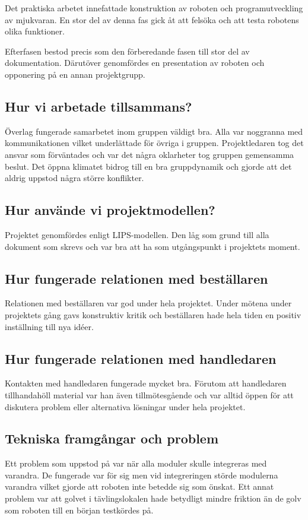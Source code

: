 \documentclass[11pt]{article}
\begin{document}
Det praktiska arbetet innefattade konstruktion av roboten och programutveckling av mjukvaran. En stor del av denna fas gick åt att felsöka och att testa robotens olika funktioner. 

Efterfasen bestod precis som den förberedande fasen till stor del av dokumentation. Därutöver genomfördes en presentation av roboten och opponering på en annan projektgrupp.

\subsection{Hur vi arbetade tillsammans?}
Överlag fungerade samarbetet inom gruppen väldigt bra. Alla var noggranna med kommunikationen vilket underlättade för övriga i gruppen. Projektledaren tog det ansvar som förväntades och var det några oklarheter tog gruppen gemensamma beslut. Det öppna klimatet bidrog till en bra gruppdynamik och gjorde att det aldrig uppstod några större konflikter.

\subsection{Hur använde vi projektmodellen?} 
Projektet genomfördes enligt LIPS-modellen. Den låg som grund till alla dokument som skrevs och var bra att ha som utgångspunkt i projektets moment. 

\subsection{Hur fungerade relationen med beställaren}
Relationen med beställaren var god under hela projektet. Under mötena under projektets gång gavs konstruktiv kritik och beställaren hade hela tiden en positiv inställning till nya idéer. 

\subsection{Hur fungerade relationen med handledaren}
Kontakten med handledaren fungerade mycket bra. Förutom att handledaren tillhandahöll material var han även  tillmötesgående och var alltid öppen för att diskutera problem eller alternativa lösningar under hela projektet.

\subsection{Tekniska framgångar och problem}
Ett problem som uppstod på var när alla moduler skulle integreras med varandra. De fungerade var för sig men vid integreringen störde modulerna varandra vilket gjorde att roboten inte betedde sig som önskat. Ett annat problem var att golvet i tävlingslokalen hade betydligt mindre friktion än de golv som roboten till en början testkördes på. 
\end{document}
